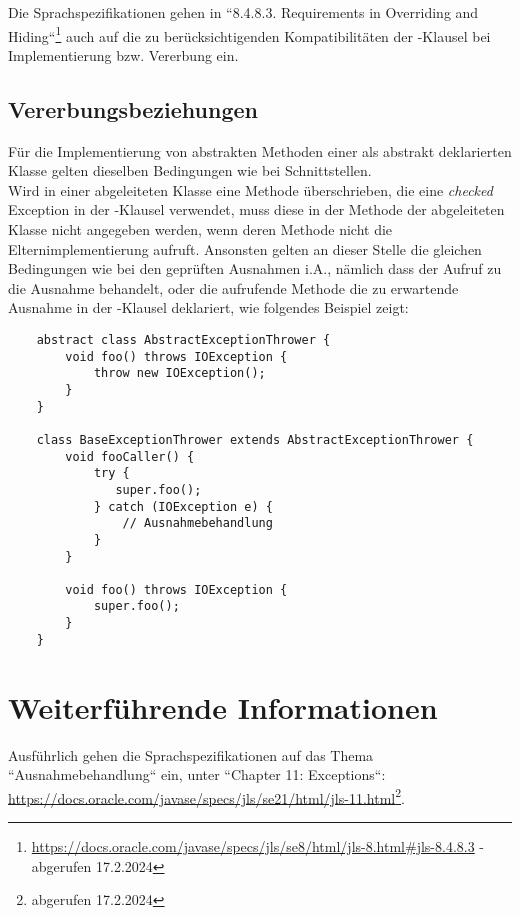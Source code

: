 Die Sprachspezifikationen gehen in ``8.4.8.3. Requirements in Overriding and Hiding``\footnote{
    \url{https://docs.oracle.com/javase/specs/jls/se8/html/jls-8.html#jls-8.4.8.3} - abgerufen 17.2.2024
} auch auf die zu berücksichtigenden Kompatibilitäten der -Klausel bei Implementierung bzw. Vererbung ein.

\subsection{Vererbungsbeziehungen}

Für die Implementierung von abstrakten Methoden einer als abstrakt deklarierten Klasse gelten dieselben Bedingungen wie bei Schnittstellen.\\

\noindent
Wird in einer abgeleiteten Klasse eine Methode überschrieben, die eine \textit{checked} Exception in der  -Klausel verwendet, muss diese in der Methode der abgeleiteten Klasse nicht angegeben werden, wenn deren Methode nicht die Elternimplementierung aufruft. Ansonsten gelten an dieser Stelle die gleichen Bedingungen wie bei den geprüften Ausnahmen i.A., nämlich dass der Aufruf zu  die Ausnahme behandelt, oder die aufrufende Methode die zu erwartende Ausnahme in der -Klausel deklariert, wie folgendes Beispiel zeigt:

\begin{verbatim}
    abstract class AbstractExceptionThrower {
        void foo() throws IOException {
            throw new IOException();
        }
    }

    class BaseExceptionThrower extends AbstractExceptionThrower {
        void fooCaller() {
            try {
               super.foo();
            } catch (IOException e) {
                // Ausnahmebehandlung
            }
        }

        void foo() throws IOException {
            super.foo();
        }
    }
\end{verbatim}

\section{Weiterführende Informationen}
Ausführlich gehen die Sprachspezifikationen auf das Thema ``Ausnahmebehandlung`` ein, unter ``Chapter 11: Exceptions``: \url{https://docs.oracle.com/javase/specs/jls/se21/html/jls-11.html}\footnote{abgerufen 17.2.2024}.\\


